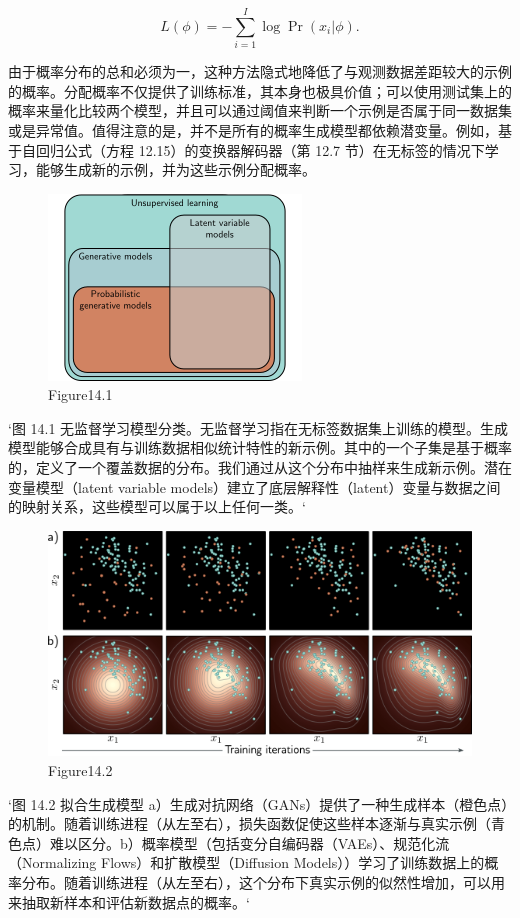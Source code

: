 \[
L(\phi) = -\sum_{i=1}^{I} \log \Pr(x_i|\phi) .
\]

由于概率分布的总和必须为一，这种方法隐式地降低了与观测数据差距较大的示例的概率。分配概率不仅提供了训练标准，其本身也极具价值；可以使用测试集上的概率来量化比较两个模型，并且可以通过阈值来判断一个示例是否属于同一数据集或是异常值。值得注意的是，并不是所有的概率生成模型都依赖潜变量。例如，基于自回归公式（方程 12.15）的变换器解码器（第 12.7 节）在无标签的情况下学习，能够生成新的示例，并为这些示例分配概率。

\begin{figure}[h!]
\centering
\includegraphics[width=0.7\linewidth]{png/chapter14/UnsupOverview.png}
\caption{Figure14.1}
\end{figure}

`图 14.1 无监督学习模型分类。无监督学习指在无标签数据集上训练的模型。生成模型能够合成具有与训练数据相似统计特性的新示例。其中的一个子集是基于概率的，定义了一个覆盖数据的分布。我们通过从这个分布中抽样来生成新示例。潜在变量模型（latent variable models）建立了底层解释性（latent）变量与数据之间的映射关系，这些模型可以属于以上任何一类。`

\begin{figure}[h!]
\centering
\includegraphics[width=0.7\linewidth]{png/chapter14/UnsupLearning.png}
\caption{Figure14.2}
\end{figure}

`图 14.2 拟合生成模型 a）生成对抗网络（GANs）提供了一种生成样本（橙色点）的机制。随着训练进程（从左至右），损失函数促使这些样本逐渐与真实示例（青色点）难以区分。b）概率模型（包括变分自编码器（VAEs）、规范化流（Normalizing Flows）和扩散模型（Diffusion Models））学习了训练数据上的概率分布。随着训练进程（从左至右），这个分布下真实示例的似然性增加，可以用来抽取新样本和评估新数据点的概率。`

